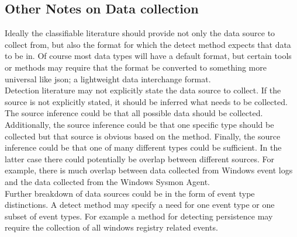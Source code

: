 \documentclass[10pt]{IEEEtran}
\begin{document}
\subsection{Other Notes on Data collection}
Ideally the classifiable literature should provide not only the data source to collect from, but also the format for which the detect method expects that data to be in. Of course most data types will have a default format, but certain tools or methods may require that the format be converted to something more universal like json; a lightweight data interchange format\cite{crockford2009introducing}.\\
Detection literature may not explicitly state the data source to collect. If the source is not explicitly stated, it should be inferred what needs to be collected. The source inference could be that all possible data should be collected. Additionally, the source inference could be that one specific type should be collected but that source is obvious based on the method. Finally, the source inference could be that one of many different types could be sufficient. In the latter case there could potentially be overlap between different sources. For example, there is much overlap between data collected from Windows event logs and the data collected from the Windows Sysmon Agent.\\
Further breakdown of data sources could be in the form of event type distinctions. A detect method may specify a need for one event type or one subset of event types. For example a method for detecting persistence may require the collection of all windows registry related events.
\end{document}
